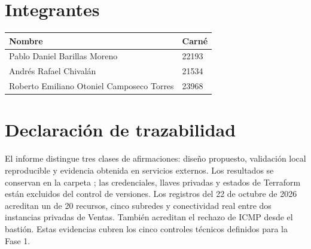 \section*{Integrantes}

\begin{tabularx}{\textwidth}{Y C{3cm}}
\toprule
\textbf{Nombre} & \textbf{Carné} \\
\midrule
Pablo Daniel Barillas Moreno & 22193 \\
Andrés Rafael Chivalán & 21534 \\
Roberto Emiliano Otoniel Camposeco Torres & 23968 \\
\bottomrule
\end{tabularx}

\section*{Declaración de trazabilidad}

El informe distingue tres clases de afirmaciones: diseño propuesto, validación local reproducible y evidencia obtenida en servicios externos. Los resultados se conservan en la carpeta ; las credenciales, llaves privadas y estados de Terraform están excluidos del control de versiones. Los registros del 22 de octubre de 2026 acreditan un  de 20 recursos, cinco subredes y conectividad real entre dos instancias privadas de Ventas. También acreditan el rechazo de ICMP desde el bastión. Estas evidencias cubren los cinco controles técnicos definidos para la Fase 1.
